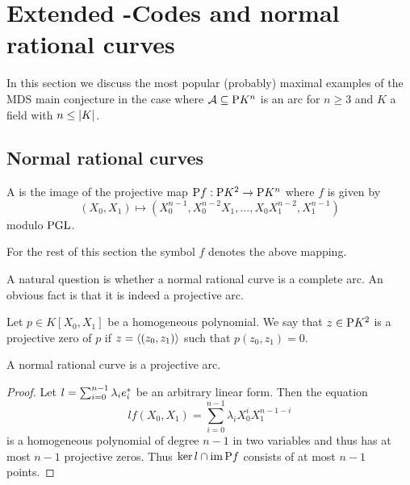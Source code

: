 \section{Extended -Codes and normal rational curves}%
\makeatletter%
\def\@currentlabel{Section \thesection}%
\makeatother%
\label{sec-reedsolomon}

In this section we discuss the most popular (probably) maximal examples of the MDS main conjecture in the case where $\cA\setleq \P K^n$ is an arc for $n\geq 3$ and $K$ a field with $n\leq\left\vert{K}\right\vert$.

\subsection{Normal rational curves}

\begin{definition}\label{norratcurve}
    A  is the image of the projective map $\mathrm{P}{f}:\mathrm{P}{K^2}\rightarrow\mathrm{P}{K^n}$ where $f$ is given by
    $$
    (X_0,X_1) \mapsto (X_0^{n-1},X_0^{n-2}X_1,\ldots,X_0 X_1^{n-2},X_1^{n-1})
    $$
    modulo $\mathrm{PGL}$.
\end{definition}

\begin{convention}
For the rest of this section the symbol $f$ denotes the above mapping.    
\end{convention}

A natural question is whether a normal rational curve is a complete arc.
An obvious fact is that it is indeed a projective arc.

\begin{definition}
    Let $p\in K[X_0,X_1]$ be a homogeneous polynomial. We say that $z\in\P K^2$ is a projective zero of $p$ if $z=\gen{(z_0,z_1)}$ such that $p(z_0,z_1)=0$. 
\end{definition}

\begin{lemma}\label{norratcurve-arc}
    A normal rational curve is a projective arc.
\end{lemma}

\begin{proof}
    Let $l=\sum_{i=0}^{n-1}{\lambda_i {e}^{\ast}_i}$ be an arbitrary linear form. Then the equation
    $$
    lf(X_0,X_1)=\sum_{i=0}^{n-1}{\lambda_i X_0^{i}X_1^{n-1-i}}
    $$
    is a homogeneous polynomial of degree $n-1$ in two variables and thus has at most $n-1$ projective zeros. Thus $\ker l\setmeet \im\P f$ consists of at most $n-1$ points.
\end{proof}

